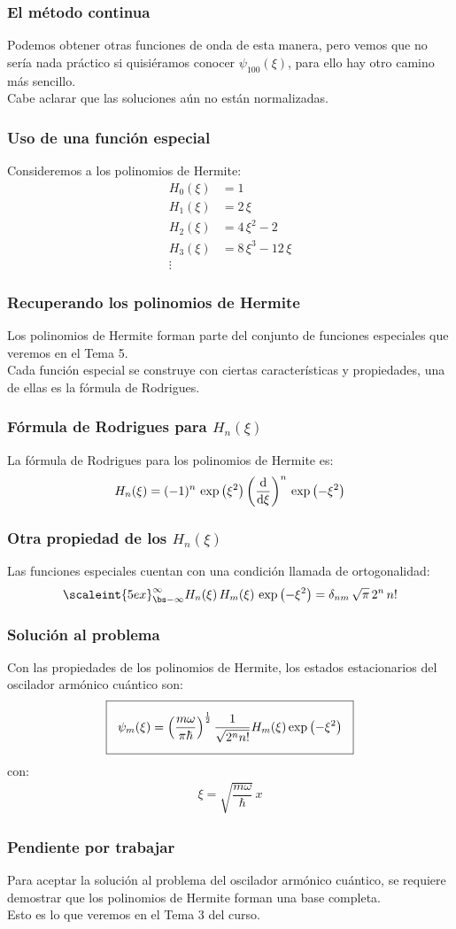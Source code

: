 \documentclass[12pt]{beamer}
\begin{document}
\begin{frame}
\frametitle{El método continua}
Podemos obtener otras funciones de onda de esta manera, \pause pero vemos que no sería nada práctico si quisiéramos conocer $\psi_{100}(\xi)$, para ello hay otro camino más sencillo.
\\
\bigskip
\pause
Cabe aclarar que las soluciones aún no están normalizadas.
\end{frame}
\begin{frame}
\frametitle{Uso de una función especial}
Consideremos a los polinomios de Hermite:
\pause
\begin{align*}
H_{0}(\xi) &= 1 \\[0.5em]
H_{1}(\xi) &= 2 \, \xi \\[0.5em]
H_{2}(\xi) &= 4 \, \xi^{2} - 2 \\[0.5em]
H_{3}(\xi) &= 8 \, \xi^{3} - 12 \, \xi \\[0.5em]
\vdots
\end{align*}
\end{frame}
\begin{frame}
\frametitle{Recuperando los polinomios de Hermite}
Los polinomios de Hermite forman parte del conjunto de funciones especiales que veremos en el Tema 5.
\\
\bigskip
\pause
Cada función especial se construye con ciertas características y propiedades, una de ellas es la fórmula de Rodrigues.
\end{frame}
\begin{frame}
\frametitle{Fórmula de Rodrigues para $H_{n}(\xi)$}
La fórmula de Rodrigues para los polinomios de Hermite es:
\begin{align*}
H_{n} (\xi) = (-1)^{n} \, \exp \left( \xi^{2} \right) \left( \dv{\xi} \right)^{n} \, \exp \left( - \xi^{2} \right)
\end{align*}
\end{frame}
\begin{frame}
\frametitle{Otra propiedad de los $H_{n}(\xi)$}
Las funciones especiales cuentan con una condición llamada de ortogonalidad:
\begin{align*}
\scaleint{5ex}_{\bs - \infty}^{\infty} H_{n}(\xi) \, H_{m}(\xi) \, \exp \left( - \xi^{2} \right) = \delta_{nm} \, \sqrt{\pi} \, 2^{n} \, n!
\end{align*}
\end{frame}
\begin{frame}
\frametitle{Solución al problema}
Con las propiedades de los polinomios de Hermite, los estados estacionarios del oscilador armónico cuántico son:
\begin{align*}
\setlength{\fboxsep}{3\fboxsep}\boxed{
\psi_{m}(\xi) = \left( \dfrac{m \omega}{\pi \hbar} \right)^{\frac{1}{2}} \dfrac{1}{\sqrt{2^{n} n!}} H_{m}(\xi) \exp \left( - \xi^{2} \right) }
\end{align*}
con:
\begin{align*}
\xi = \sqrt{\dfrac{m \omega}{\hbar}} \, x
\end{align*}
\end{frame}
\begin{frame}
\frametitle{Pendiente por trabajar}
Para aceptar la solución al problema del oscilador armónico cuántico, se requiere demostrar que los polinomios de Hermite forman una base completa.
\\
\bigskip
Esto es lo que veremos en el Tema 3 del curso.
\end{frame}
\end{document}
